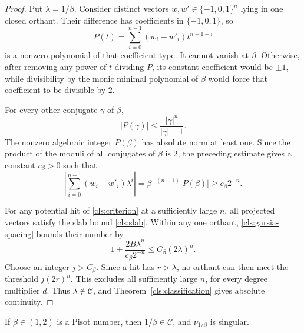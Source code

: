 \begin{proof}
Put $\lambda=1/\beta$.  Consider distinct vectors
$w,w'\in\{-1,0,1\}^n$ lying in one closed orthant.  Their difference
has coefficients in $\{-1,0,1\}$, so
\[
  P(t)=\sum_{i=0}^{n-1}(w_i-w'_i)t^{n-1-i}
\]
is a nonzero polynomial of that coefficient type.  It cannot vanish
at $\beta$.  Otherwise, after removing any power of $t$ dividing
$P$, its constant coefficient would be $\pm1$, while divisibility by
the monic minimal polynomial of $\beta$ would force that coefficient
to be divisible by $2$.

For every other conjugate $\gamma$ of $\beta$,
\[
  |P(\gamma)|\leq\frac{|\gamma|^n}{|\gamma|-1}.
\]
The nonzero algebraic integer $P(\beta)$ has absolute norm at least
one.  Since the product of the moduli of all conjugates of $\beta$
is $2$, the preceding estimate gives a constant $c_\beta>0$ such that
\begin{equation}
  \left|\sum_{i=0}^{n-1}(w_i-w'_i)\lambda^i\right|
  =\beta^{-(n-1)}|P(\beta)|\geq c_\beta2^{-n}.
  \label{cls:garsia-spacing}
\end{equation}

For any potential hit of \eqref{cls:criterion} at a sufficiently large
$n$, all projected vectors satisfy the slab bound \eqref{cls:slab}.
Within any one orthant, \eqref{cls:garsia-spacing} bounds their number
by
\[
  1+\frac{2B\lambda^n}{c_\beta2^{-n}}
       \leq C_\beta(2\lambda)^n.
\]
Choose an integer $j>C_\beta$.  Since a hit has $r>\lambda$, no
orthant can then meet the threshold $j(2r)^n$.  This excludes all
sufficiently large $n$, for every degree multiplier $d$.  Thus
$\lambda\notin\mathcal C$, and Theorem~\ref{cls:classification}
gives absolute continuity.
\end{proof}

\begin{proposition}
\label{cls:pisot}
If $\beta\in(1,2)$ is a Pisot number, then $1/\beta\in\mathcal C$,
and $\nu_{1/\beta}$ is singular.
\end{proposition}

